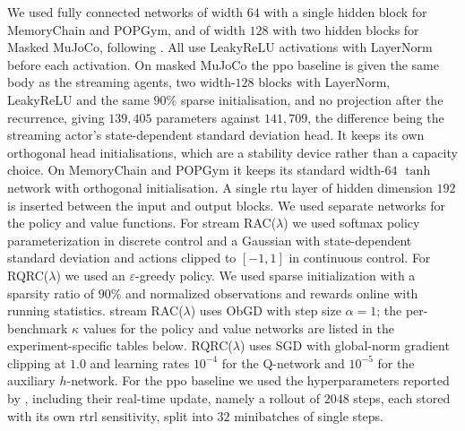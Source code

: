 \documentclass{article}
\begin{document}
We used fully connected networks of width $64$ with a single hidden block for MemoryChain and POPGym, and of width $128$ with two hidden blocks for Masked MuJoCo, following \citet{sharifnassab2026intentional}. All use LeakyReLU activations with LayerNorm \citep{ba2016layer} before each activation. On masked MuJoCo the \gls{ppo} baseline is given the same body as the streaming agents, two width-$128$ blocks with LayerNorm, LeakyReLU and the same $90\%$ sparse initialisation, and no projection after the recurrence, giving $139{,}405$ parameters against $141{,}709$, the difference being the streaming actor's state-dependent standard deviation head. It keeps its own orthogonal head initialisations, which are a stability device rather than a capacity choice. On MemoryChain and POPGym it keeps its standard width-$64$ $\tanh$ network with orthogonal initialisation. A single \gls{rtu}
layer of hidden dimension $192$ is inserted between the input and
output blocks. We used separate networks for the policy and value
functions. For stream RAC($\lambda$) we used softmax policy parameterization in
discrete control and a Gaussian with state-dependent standard deviation and actions clipped to $[-1, 1]$ in continuous control. For RQRC($\lambda$) we used an
$\varepsilon$-greedy policy. We used sparse
initialization with a sparsity ratio of $90\%$
\citep{elsayed2024streaming} and normalized observations and rewards
online with running statistics. stream RAC($\lambda$) uses ObGD with step size
$\alpha = 1$; the per-benchmark $\kappa$ values for the policy and
value networks are listed in the experiment-specific tables below. RQRC($\lambda$)
uses SGD with global-norm gradient clipping at $1.0$ and learning rates
$10^{-4}$ for the Q-network and $10^{-5}$ for the auxiliary
$h$-network. For the \gls{ppo} baseline we used the
hyperparameters reported by \citet{elelimy2024real}, including their real-time update, namely
a rollout of $2048$ steps, each stored with its own \gls{rtrl} sensitivity, split into
$32$ minibatches of single steps.
\end{document}
